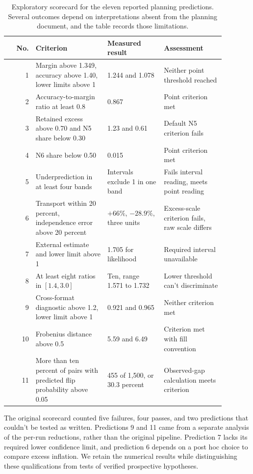 \begin{table}[htbp]
\centering\small\setlength{\tabcolsep}{3pt}
\caption{Exploratory scorecard for the eleven reported planning predictions. Several outcomes depend on interpretations absent from the planning document, and the table records those limitations.}
\label{tab:original6}
\begin{tabular}{rp{0.33\linewidth}p{0.26\linewidth}p{0.29\linewidth}}\hline
No. & Criterion & Measured result & Assessment\\\hline
1 & Margin above 1.349, accuracy above 1.40, lower limits above 1 & 1.244 and 1.078 & Neither point threshold reached\\
2 & Accuracy-to-margin ratio at least 0.8 & 0.867 & Point criterion met\\
3 & Retained excess above 0.70 and N5 share below 0.30 & 1.23 and 0.61 & Default N5 criterion fails\\
4 & N6 share below 0.50 & 0.015 & Point criterion met\\
5 & Underprediction in at least four bands & Intervals exclude 1 in one band & Fails interval reading, meets point reading\\
6 & Transport within 20 percent, independence error above 20 percent & $+66\%$, $-28.9\%$, three units & Excess-scale criterion fails, raw scale differs\\
7 & External estimate and lower limit above 1 & 1.705 for likelihood & Required interval unavailable\\
8 & At least eight ratios in $[1.4,3.0]$ & Ten, range 1.571 to 1.732 & Lower threshold can't discriminate\\
9 & Cross-format diagnostic above 1.2, lower limit above 1 & 0.921 and 0.965 & Neither criterion met\\
10 & Frobenius distance above 0.5 & 5.59 and 6.49 & Criterion met with fill convention\\
11 & More than ten percent of pairs with predicted flip probability above 0.05 & 455 of 1,500, or 30.3 percent & Observed-gap calculation meets criterion\\\hline
\end{tabular}
\end{table}

The original scorecard counted five failures, four passes, and two predictions that couldn't be tested as written. Predictions 9 and 11 came from a separate analysis of the per-run reductions, rather than the original pipeline. Prediction 7 lacks its required lower confidence limit, and prediction 6 depends on a post hoc choice to compare excess inflation. We retain the numerical results while distinguishing these qualifications from tests of verified prospective hypotheses.

